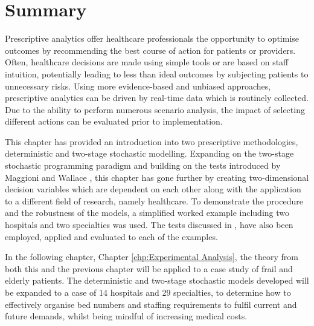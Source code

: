 \documentclass[../thesis.tex]{subfiles}
\begin{document}
\section{Summary}
Prescriptive analytics offer healthcare professionals the opportunity to optimise outcomes by recommending the best course of action for patients or providers. Often, healthcare decisions are made using simple tools or are based on staff intuition, potentially leading to less than ideal outcomes by subjecting patients to unnecessary risks. Using more evidence-based and unbiased approaches, prescriptive analytics can be driven by real-time data which is routinely collected. Due to the ability to perform numerous scenario analysis, the impact of selecting different actions can be evaluated prior to implementation.

This chapter has provided an introduction into two prescriptive methodologies, deterministic and two-stage stochastic modelling. Expanding on the two-stage stochastic programming paradigm and building on the tests introduced by Maggioni and Wallace \cite{Maggioni2010}, this chapter has gone further by creating two-dimensional decision variables which are dependent on each other along with the application to a different field of research, namely healthcare. To demonstrate the procedure and the robustness of the models, a simplified worked example including two hospitals and two specialties was used. The tests discussed in \cite{Maggioni2010}, have also been employed, applied and evaluated to each of the examples.

In the following chapter, Chapter \ref{chp:Experimental Analysis}, the theory from both this and the previous chapter will be applied to a case study of frail and elderly patients. The deterministic and two-stage stochastic models developed will be expanded to a case of 14 hospitals and 29 specialties, to determine how to effectively organise bed numbers and staffing requirements to fulfil current and future demands, whilst being mindful of increasing medical costs.
\end{document}
